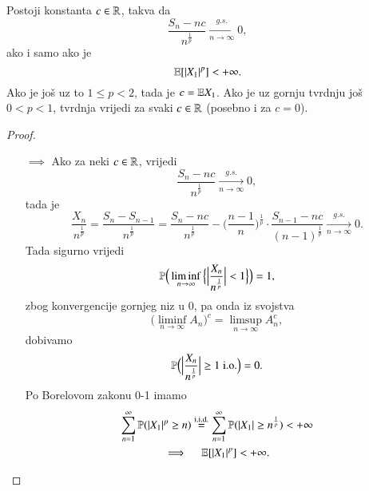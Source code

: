 \begin{tm}  \label{tm:14.2}
    Postoji konstanta $c \in \mathbb{R}$, takva da
    \begin{equation*}
        \frac{S_n - nc}{n^\frac{1}{p}} \xrightarrow[n \to \infty]{g.s.} 0,
    \end{equation*}
    ako i samo ako je
    \begin{equation*}
        \mathbb{E} [ |X_1|^p ] < + \infty.
    \end{equation*}
    Ako je jo\v s uz to $1 \leq p < 2$, tada je $c = \mathbb{E} X_1$.
    Ako je uz gornju tvrdnju jo\v s $0 < p <1$, tvrdnja vrijedi za svaki $c \in \mathbb{R}$ (posebno i za $c = 0$).
\end{tm}

\begin{proof}
    \quad \\
    \begin{enumerate}
        \item[$\implies$]
        Ako za neki $c \in \mathbb{R}$, vrijedi
        \begin{equation*}
            \frac{S_n - nc}{n^\frac{1}{p}} \xrightarrow[n \to \infty]{g.s.} 0,
        \end{equation*}
        tada je
        \begin{equation*}
            \frac{X_n}{n^\frac{1}{p}} = \frac{S_n - S_{n - 1}}{n^\frac{1}{p}} = \frac{S_n - nc}{n^\frac{1}{p}} - \Big( \frac{n - 1}{n} \Big)^\frac{1}{p} \cdot \frac{S_{n - 1} - nc}{(n - 1)^\frac{1}{p}} \xrightarrow[n \to \infty]{g.s.} 0.
        \end{equation*}
        Tada sigurno vrijedi
        \begin{equation*}
            \mathbb{P} \Big( \liminf\limits_{n \to \infty} \Big\{ \Big| \frac{X_n}{n^\frac{1}{p}} \Big| < 1 \Big\} \Big) = 1,
        \end{equation*}
        zbog konvergencije gornjeg niz u $0$, pa onda iz svojstva
        \begin{equation*}
            \Big( \liminf\limits_{n \to \infty} A_n \Big)^c = \limsup\limits_{n \to \infty} A_n^c,
        \end{equation*}
        dobivamo
        \begin{equation*}
            \mathbb{P} \Big( \Big| \frac{X_n}{n^\frac{1}{p}} \Big| \geq 1 \; \mathrm{i.o.} \Big) = 0.
        \end{equation*}
        Po Borelovom zakonu 0-1 imamo
        \begin{equation*}
            \begin{gathered}
                \sum\limits_{n = 1}^{\infty} \mathbb{P} ( |X_1|^p \geq n ) \overset{\mathrm{i.i.d.}}{=} \sum\limits_{n = 1}^{\infty} \mathbb{P} (|X_1| \geq n^\frac{1}{p}) < +\infty\\
                \implies \quad \mathbb{E} [ |X_1|^p ] < +\infty.
            \end{gathered}
        \end{equation*}


\end{enumerate}
\end{proof}
